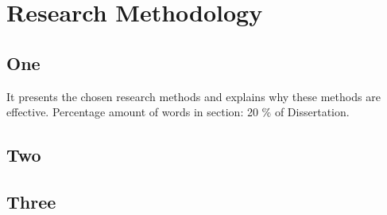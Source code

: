 
\chapter{Research Methodology}
\begin{spacing}{2.0}


\section{One}

It presents the chosen research methods and explains why these methods are effective. Percentage amount of words in section: 20 \% of Dissertation.

\section{Two}


\section{Three}


\end{spacing}
\newpage
